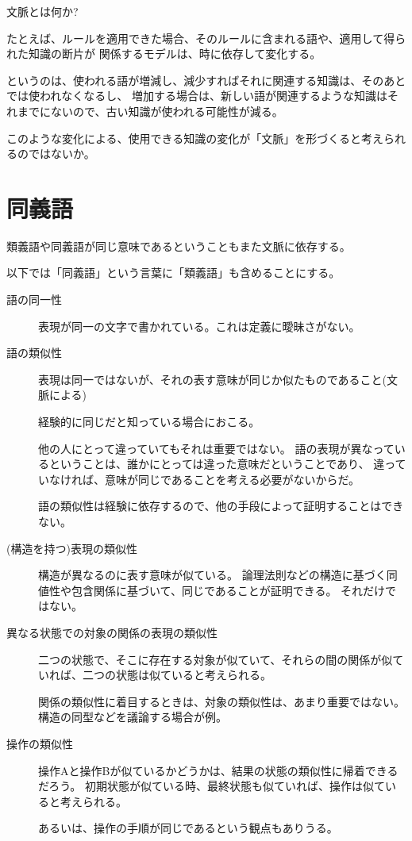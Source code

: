 \documentclass[10pt, oneside]{jarticle}   	%
\begin{document}
文脈とは何か?

たとえば、ルールを適用できた場合、そのルールに含まれる語や、適用して得られた知識の断片が
関係するモデルは、時に依存して変化する。

というのは、使われる語が増減し、減少すればそれに関連する知識は、そのあとでは使われなくなるし、
増加する場合は、新しい語が関連するような知識はそれまでにないので、古い知識が使われる可能性が減る。

このような変化による、使用できる知識の変化が「文脈」を形づくると考えられるのではないか。


\section{同義語}
類義語や同義語が同じ意味であるということもまた文脈に依存する。

以下では「同義語」という言葉に「類義語」も含めることにする。


\begin{description}
\item[語の同一性] 表現が同一の文字で書かれている。これは定義に曖昧さがない。
\item[語の類似性] 表現は同一ではないが、それの表す意味が同じか似たものであること(文脈による)

経験的に同じだと知っている場合におこる。

他の人にとって違っていてもそれは重要ではない。
語の表現が異なっているということは、誰かにとっては違った意味だということであり、
違っていなければ、意味が同じであることを考える必要がないからだ。

語の類似性は経験に依存するので、他の手段によって証明することはできない。

\item[(構造を持つ)表現の類似性] 構造が異なるのに表す意味が似ている。
論理法則などの構造に基づく同値性や包含関係に基づいて、同じであることが証明できる。
それだけではない。
\item[異なる状態での対象の関係の表現の類似性] 
二つの状態で、そこに存在する対象が似ていて、それらの間の関係が似ていれば、二つの状態は似ていると考えられる。

関係の類似性に着目するときは、対象の類似性は、あまり重要ではない。
構造の同型などを議論する場合が例。


\item[操作の類似性] 操作Aと操作Bが似ているかどうかは、結果の状態の類似性に帰着できるだろう。
初期状態が似ている時、最終状態も似ていれば、操作は似ていると考えられる。

あるいは、操作の手順が同じであるという観点もありうる。
\end{description}
\end{document}
